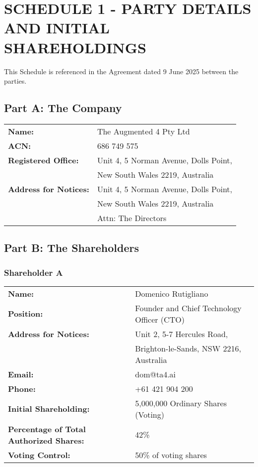 \section*{SCHEDULE 1 - PARTY DETAILS AND INITIAL SHAREHOLDINGS}

This Schedule is referenced in the Agreement dated 9 June 2025 between the parties.

\subsection*{Part A: The Company}
\begin{tabularx}{\textwidth}{@{} l X @{}}
\textbf{Name:} & The Augmented 4 Pty Ltd \\
\textbf{ACN:} & 686 749 575 \\
\textbf{Registered Office:} & Unit 4, 5 Norman Avenue, Dolls Point, \\
& New South Wales 2219, Australia \\
\textbf{Address for Notices:} & Unit 4, 5 Norman Avenue, Dolls Point, \\
& New South Wales 2219, Australia \\
& Attn: The Directors
\end{tabularx}

\vspace{1em}

\subsection*{Part B: The Shareholders}

\subsubsection*{Shareholder A}
\begin{tabularx}{\textwidth}{@{} l X @{}}
\textbf{Name:} & Domenico Rutigliano \\
\textbf{Position:} & Founder and Chief Technology Officer (CTO) \\
\textbf{Address for Notices:} & Unit 2, 5-7 Hercules Road, \\
& Brighton-le-Sands, NSW 2216, Australia \\
\textbf{Email:} & dom@ta4.ai \\
\textbf{Phone:} & +61 421 904 200 \\
\textbf{Initial Shareholding:} & 5,000,000 Ordinary Shares (Voting) \\
\textbf{Percentage of Total Authorized Shares:} & 42\% \\
\textbf{Voting Control:} & 50\% of voting shares
\end{tabularx}

